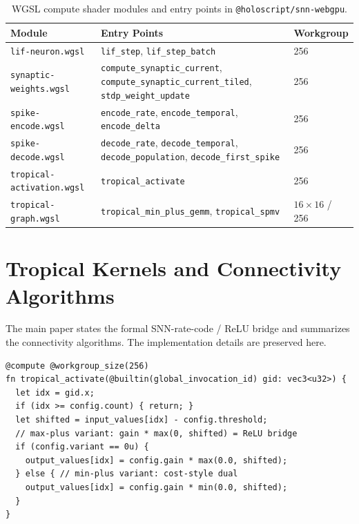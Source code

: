 \documentclass[10pt]{article}
\makeatletter
\newcommand{\snnwebgpu}{\texttt{@holoscript/snn-webgpu}}
\makeatother
\begin{document}
\begin{table}[h]
\centering
\caption{WGSL compute shader modules and entry points in \snnwebgpu{}.}
\label{tab:shaders}
\small
\begin{tabular}{@{}lll@{}}
\toprule
\textbf{Module} & \textbf{Entry Points} & \textbf{Workgroup} \\
\midrule
\texttt{lif-neuron.wgsl}       & \texttt{lif\_step}, \texttt{lif\_step\_batch}      & 256 \\
\texttt{synaptic-weights.wgsl} & \texttt{compute\_synaptic\_current}, \texttt{compute\_synaptic\_current\_tiled}, \texttt{stdp\_weight\_update} & 256 \\
\texttt{spike-encode.wgsl}     & \texttt{encode\_rate}, \texttt{encode\_temporal}, \texttt{encode\_delta} & 256 \\
\texttt{spike-decode.wgsl}     & \texttt{decode\_rate}, \texttt{decode\_temporal}, \texttt{decode\_population}, \texttt{decode\_first\_spike} & 256 \\
\texttt{tropical-activation.wgsl} & \texttt{tropical\_activate} & 256 \\
\texttt{tropical-graph.wgsl}   & \texttt{tropical\_min\_plus\_gemm}, \texttt{tropical\_spmv} & $16\times16$ / 256 \\
\bottomrule
\end{tabular}
\end{table}

\section{Tropical Kernels and Connectivity Algorithms}
\label{supp:tropical-kernels}

The main paper states the formal SNN-rate-code / ReLU bridge and summarizes the
connectivity algorithms. The implementation details are preserved here.

\begin{lstlisting}[caption={GPU kernel for tropical activation (WGSL).}, label=lst:tropical-wgsl]
@compute @workgroup_size(256)
fn tropical_activate(@builtin(global_invocation_id) gid: vec3<u32>) {
  let idx = gid.x;
  if (idx >= config.count) { return; }
  let shifted = input_values[idx] - config.threshold;
  // max-plus variant: gain * max(0, shifted) = ReLU bridge
  if (config.variant == 0u) {
    output_values[idx] = config.gain * max(0.0, shifted);
  } else { // min-plus variant: cost-style dual
    output_values[idx] = config.gain * min(0.0, shifted);
  }
}
\end{lstlisting}
\end{document}
